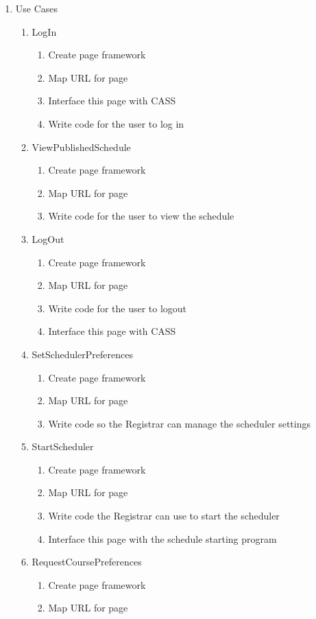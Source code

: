 \documentclass[11pt]{article}
\begin{document}
\begin{enumerate}
\item Use Cases
\begin{enumerate} 
\item LogIn
\begin{enumerate}
\item Create page framework
\item Map URL for page
\item Interface this page with CASS
\item Write code for the user to log in
\end{enumerate}
\item ViewPublishedSchedule
\begin{enumerate}
\item Create page framework
\item Map URL for page
\item Write code for the user to view the schedule
\end{enumerate}
\item LogOut
\begin{enumerate}
\item Create page framework
\item Map URL for page
\item Write code for the user to logout
\item Interface this page with CASS
\end{enumerate} 
\item SetSchedulerPreferences
 \begin{enumerate} 
\item Create page framework
\item Map URL for page
\item Write code so the Registrar can manage the scheduler settings
\end{enumerate} 
\item StartScheduler
\begin{enumerate}
\item Create page framework
\item Map URL for page
\item Write code the Registrar can use to start the scheduler
\item Interface this page with the schedule starting program
\end{enumerate} 
\item RequestCoursePreferences
\begin{enumerate} 
\item Create page framework
\item Map URL for page

\end{enumerate}
\end{enumerate}
\end{enumerate}
\end{document}
